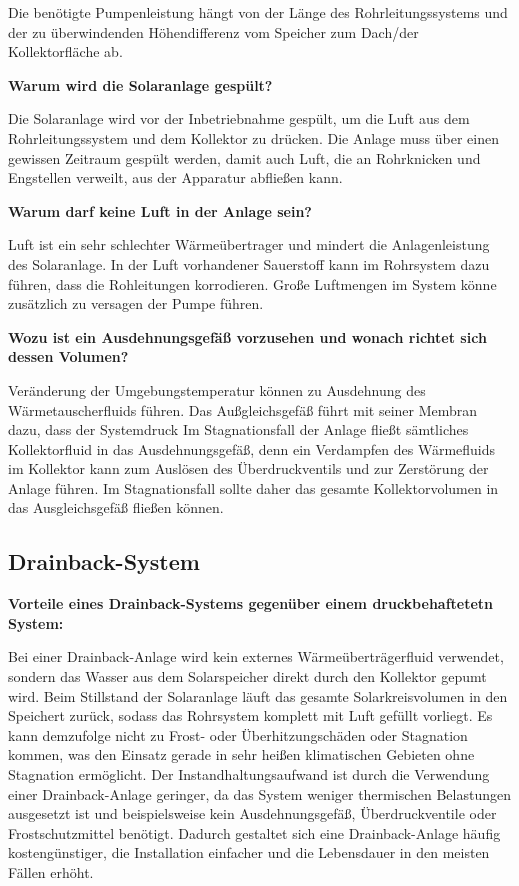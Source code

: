 Die benötigte Pumpenleistung hängt von der Länge des Rohrleitungssystems und der zu überwindenden Höhendifferenz vom Speicher zum Dach/der Kollektorfläche ab. 

\textbf{Warum wird die Solaranlage gespült?}

Die Solaranlage wird vor der Inbetriebnahme gespült, um die Luft aus dem Rohrleitungssystem und dem Kollektor zu drücken. Die Anlage muss über einen gewissen Zeitraum gespült werden, damit auch Luft, die an Rohrknicken und Engstellen verweilt, aus der Apparatur abfließen kann.

\textbf{Warum darf keine Luft in der Anlage sein?}

Luft ist ein sehr schlechter Wärmeübertrager und mindert die Anlagenleistung des Solaranlage. In der Luft vorhandener Sauerstoff kann im Rohrsystem dazu führen, dass die Rohleitungen korrodieren. Große Luftmengen im System könne zusätzlich zu versagen der Pumpe führen. 

\textbf{Wozu ist ein Ausdehnungsgefäß vorzusehen und wonach richtet sich dessen Volumen?}

Veränderung der Umgebungstemperatur können zu Ausdehnung des Wärmetauscherfluids führen. Das Außgleichsgefäß führt mit seiner Membran dazu, dass der Systemdruck Im Stagnationsfall der Anlage fließt sämtliches Kollektorfluid in das Ausdehnungsgefäß, denn ein Verdampfen des Wärmefluids im Kollektor kann zum Auslösen des Überdruckventils und zur Zerstörung der Anlage führen. Im Stagnationsfall sollte daher das gesamte Kollektorvolumen in das Ausgleichsgefäß fließen können.

\subsection{Drainback-System}

\textbf{Vorteile eines Drainback-Systems gegenüber einem druckbehaftetetn System:}

Bei einer Drainback-Anlage wird kein externes Wärmeüberträgerfluid verwendet, sondern das Wasser aus dem Solarspeicher direkt durch den Kollektor gepumt wird. Beim Stillstand der Solaranlage läuft das gesamte Solarkreisvolumen in den Speichert zurück, sodass das Rohrsystem  komplett mit Luft gefüllt vorliegt. Es kann demzufolge nicht zu Frost- oder Überhitzungschäden oder Stagnation kommen, was den Einsatz gerade in sehr heißen klimatischen Gebieten ohne Stagnation ermöglicht. Der Instandhaltungsaufwand ist durch die Verwendung einer Drainback-Anlage geringer, da das System weniger thermischen Belastungen ausgesetzt ist und beispielsweise kein Ausdehnungsgefäß, Überdruckventile oder Frostschutzmittel benötigt. Dadurch gestaltet sich eine Drainback-Anlage häufig kostengünstiger, die Installation einfacher und die Lebensdauer in den meisten Fällen erhöht. \\

